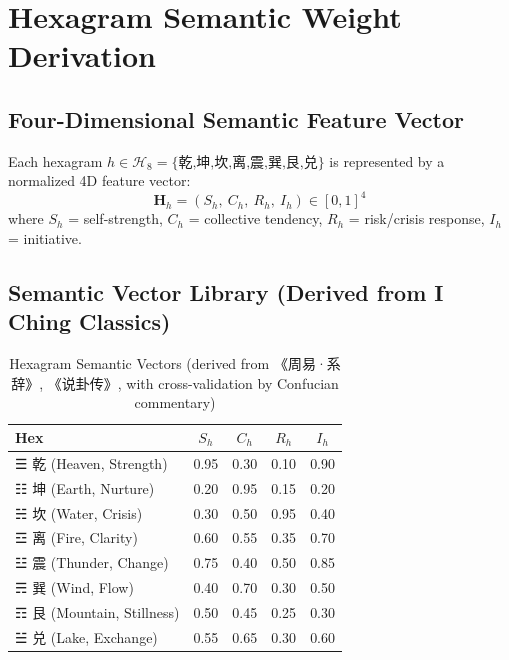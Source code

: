 \documentclass[conference]{IEEEtran}
\begin{document}

\section{Hexagram Semantic Weight Derivation}
\label{sec:derivation}

\subsection{Four-Dimensional Semantic Feature Vector}

Each hexagram $h \in \mathcal{H}_8 = \{\text{乾,坤,坎,离,震,巽,艮,兑}\}$
is represented by a normalized 4D feature vector:
\begin{equation}
\mathbf{H}_h = (S_h,\ C_h,\ R_h,\ I_h) \in [0,1]^4
\label{eq:hex-vec}
\end{equation}
where $S_h$ = self-strength, $C_h$ = collective tendency,
$R_h$ = risk/crisis response, $I_h$ = initiative.

\subsection{Semantic Vector Library (Derived from I Ching Classics)}

\begin{table}[h]
\centering
\caption{Hexagram Semantic Vectors (derived from
《周易·系辞》, 《说卦传》, with cross-validation by Confucian commentary)}
\label{tab:hex-vec}
\begin{tabular}{lcccc}
\toprule
\textbf{Hex} & $S_h$ & $C_h$ & $R_h$ & $I_h$ \\
\midrule
☰ 乾 (Heaven, Strength)      & 0.95 & 0.30 & 0.10 & 0.90 \\
☷ 坤 (Earth, Nurture)        & 0.20 & 0.95 & 0.15 & 0.20 \\
☵ 坎 (Water, Crisis)         & 0.30 & 0.50 & 0.95 & 0.40 \\
☲ 离 (Fire, Clarity)         & 0.60 & 0.55 & 0.35 & 0.70 \\
☳ 震 (Thunder, Change)       & 0.75 & 0.40 & 0.50 & 0.85 \\
☴ 巽 (Wind, Flow)            & 0.40 & 0.70 & 0.30 & 0.50 \\
☶ 艮 (Mountain, Stillness)   & 0.50 & 0.45 & 0.25 & 0.30 \\
☱ 兑 (Lake, Exchange)        & 0.55 & 0.65 & 0.30 & 0.60 \\
\bottomrule
\end{tabular}
\end{table}
\end{document}
